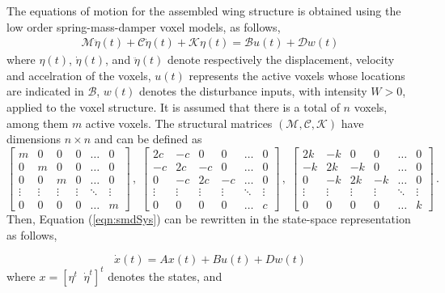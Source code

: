 \documentclass[11pt]{ucthesis}
\begin{document}
The equations of motion for the assembled wing structure is obtained using the low order spring-mass-damper voxel models, as follows,
\begin{equation}
\begin{array}{l}
\mathcal{M} \ddot{\eta}(t) + \mathcal{C} \dot{\eta}(t) + \mathcal{K} \eta(t) = \mathcal{B} u(t) + \mathcal{D} w(t)
\end{array}
\label{eqn:smdSys}
\end{equation}
where $\eta (t)$, $\dot{\eta} (t)$, and $\ddot{\eta} (t)$ denote respectively the displacement, velocity and accelration of the voxels, $u (t)$ represents the active voxels whose locations are indicated in $\mathcal{B}$, $w (t)$ denotes the disturbance inputs, with intensity $W >0$, applied to the voxel structure. It is assumed that there is a total of $n$ voxels, among them $m$ active voxels. The structural matrices $(\mathcal{M}, \mathcal{C}, \mathcal{K})$ have dimensions $n \times n$ and can be defined as
\footnotesize
\begin{equation}
\begin{bmatrix}m&0&0&0&\dots&0\\0&m&0&0&\dots&0\\0&0&m&0&\dots&0\\\vdots&\vdots&\vdots&\vdots&\ddots&\vdots \\0&0&0&0&\dots&m\end{bmatrix} \,,\;
\begin{bmatrix}2c&-c&0&0&\dots&0\\-c&2c&- c&0&\dots&0\\0&-c&2c&-c&\dots&0\\ \vdots&\vdots&\vdots&\vdots&\ddots&\vdots \\0&0&0&0&\dots&c\end{bmatrix} \,,\;
\begin{bmatrix}2k&-k&0&0&\dots&0\\-k&2k&-k&0&\dots&0\\0&-k&2k&-k&\dots&0\\ \vdots&\vdots&\vdots&\vdots&\ddots&\vdots \\0&0&0&0&\dots&k\end{bmatrix} \,.
\label{eqn:EOS}
\end{equation}
\normalsize
Then, Equation (\ref{eqn:smdSys}) can be rewritten in the state-space representation as follows,

\begin{equation}
\dot{x} (t) = A x(t) + B u(t) + D w(t)
\label{sigma1}
\end{equation}
where $x = [\eta^t \;\; \dot{\eta}^t]^t$ denotes the states, and
\end{document}
